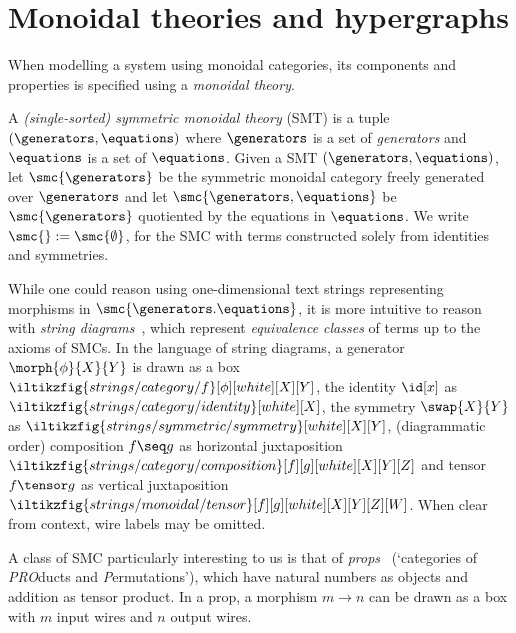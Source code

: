 \section{Monoidal theories and hypergraphs}

When modelling a system using monoidal categories, its components and
properties is specified using a \emph{monoidal theory}.

\begin{definition}
    A \emph{(single-sorted) symmetric monoidal theory} (SMT) is a tuple \(
        (\generators,\equations)
    \) where \(\generators\) is a set of \emph{generators} and \(\equations\)
    is a set of \(\equations\).
    Given a SMT \((\generators,\equations)\), let \(
        \smc{\generators}
    \) be the symmetric monoidal category freely generated over \(\generators\)
    and let \(
        \smc{\generators,\equations}
    \) be \(\smc{\generators}\) quotiented by the equations in \(\equations\).
    We write \(\smc{} := \smc{\emptyset}\), for the SMC with terms
    constructed solely from identities and symmetries.
\end{definition}

While one could reason using one-dimensional text strings representing morphisms
in \(\smc{\generators.\equations}\), it is more intuitive to reason with
\emph{string diagrams}~\cite{joyal1991geometry,selinger2011survey}, which
represent \emph{equivalence classes} of terms up to the axioms of SMCs.
In the language of string diagrams, a generator \(\morph{\phi}{X}{Y}\) is drawn
as a box \(
    \iltikzfig{strings/category/f}[\phi][white][X][Y]
\), the identity \(\id[x]\) as \(
    \iltikzfig{strings/category/identity}[white][X]
\), the symmetry \(\swap{X}{Y}\) as \(
    \iltikzfig{strings/symmetric/symmetry}[white][X][Y]
\), (diagrammatic order) composition \(f \seq g\) as horizontal juxtaposition \(
    \iltikzfig{strings/category/composition}[f][g][white][X][Y][Z]
\) and tensor \(f \tensor g\) as vertical juxtaposition \(
    \iltikzfig{strings/monoidal/tensor}[f][g][white][X][Y][Z][W]
\).
When clear from context, wire labels may be omitted.

A class of SMC particularly interesting to us is that of
\emph{props}~\cite{maclane1965categorical} (`categories of \emph{PRO}ducts and
\emph{P}ermutations'), which have natural numbers as objects and addition as
tensor product.
In a prop, a morphism \(m \to n\) can be drawn as a box with \(m\) input wires
and \(n\) output wires.

